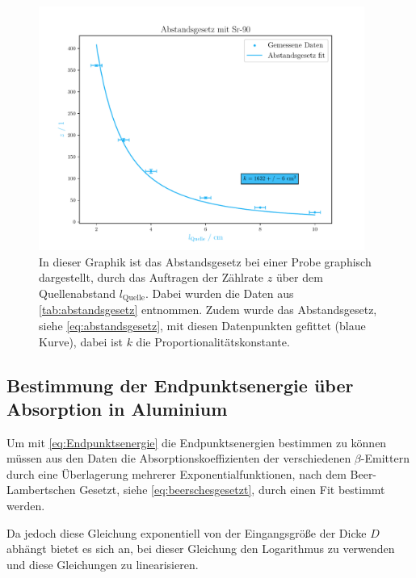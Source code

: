 \documentclass[12pt,english,ngerman]{scrartcl}
\begin{document}
\begin{figure}[H]
	\begin{center}
		\includegraphics[width = 0.95\textwidth]{figures/abstandsgesetz.pdf}
	\end{center}
	\caption[Abstandsgesetz einer  Probe]{In dieser Graphik ist
		das Abstandsgesetz bei einer  Probe graphisch dargestellt,
		durch das Auftragen der Zählrate $z$ über dem Quellenabstand
		$l_{\mathrm{Quelle}}$. Dabei wurden die Daten aus
		\autoref{tab:abstandsgesetz} entnommen. Zudem wurde das Abstandsgesetz, siehe
		\autoref{eq:abstandsgesetz}, mit diesen Datenpunkten gefittet (blaue Kurve),
		dabei ist $k$ die Proportionalitätskonstante.}\label{fig:abstandsgesetz}
\end{figure}

\subsection{Bestimmung der Endpunktsenergie über Absorption in Aluminium}

Um mit \autoref{eq:Endpunktsenergie} die Endpunktsenergien bestimmen zu können
müssen aus den Daten die Absorptionskoeffizienten der verschiedenen
$\beta$-Emittern durch eine Überlagerung mehrerer Exponentialfunktionen, nach
dem Beer-Lambertschen Gesetzt, siehe \autoref{eq:beerschesgesetzt}, durch einen
Fit bestimmt werden.

Da jedoch diese Gleichung exponentiell von der Eingangsgröße der Dicke $D$
abhängt bietet es sich an, bei dieser Gleichung den Logarithmus zu verwenden
und diese Gleichungen zu linearisieren.
\end{document}
